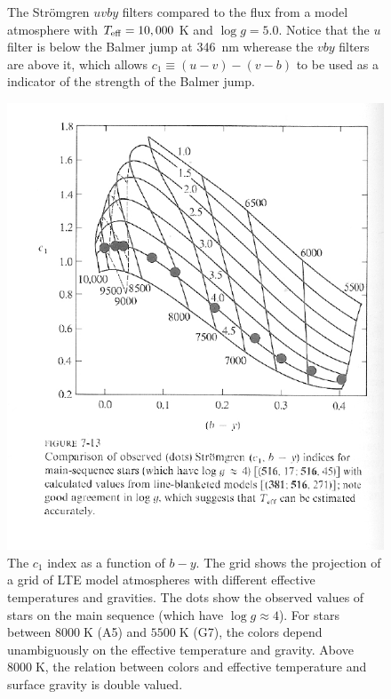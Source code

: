 \begin{figure}
\footnotesize
{}
\caption{The Strömgren $uvby$ filters compared to the flux from a model atmosphere with $T_\mathrm{eff} = 10,000$ K and $\log g = 5.0$. Notice that the $u$ filter is below the Balmer jump at 346~nm wherease the $vby$ filters are above it, which allows $c_1 \equiv (u-v)-(v-b)$ to be used as a indicator of the strength of the Balmer jump.}
\label{figure-uvby-balmer-jump}
\end{figure}

\begin{figure}
\centering
\includegraphics[width=0.5\linewidth]{figures/stromgren.pdf}
\caption{The $c_1$ index as a function of $b-y$. The grid shows the projection of a grid of LTE model atmospheres with different effective temperatures and gravities. The dots show the observed values of stars on the main sequence (which have $\log g\approx 4$). For stars between $8000\;\mathrm{K}$ (A5) and $5500\;\mathrm{K}$ (G7), the colors depend unambiguously on the effective temperature and gravity. Above $8000\;\mathrm{K}$, the relation between colors and effective temperature and surface gravity is double valued.}
\label{figure-uvby-calibration}
\end{figure}


